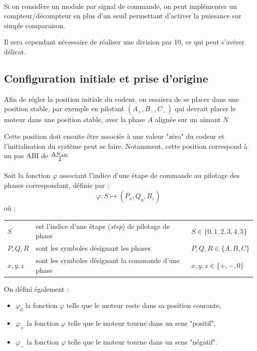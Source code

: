 \paragraph{}
Si on considère un module par signal de commande, on peut implémenter un compteur/décompteur en plus d'un seuil permettant d'activer la puissance sur simple comparaison.

Il sera cependant nécessaire de réaliser une division par 10, ce qui peut s'avérer délicat.

\subsection{Configuration initiale et prise d'origine}
Afin de régler la position initiale du codeur, on essaiera de se placer dans une position stable, par exemple en pilotant $(A_+, B_-, C_-)$ qui devrait placer le moteur dans une position stable, avec la phase $A$ alignée sur un aimant $N$

Cette position doit ensuite être associée à une valeur "zéro" du codeur et l'initialisation du système peut se faire.
Notamment, cette position correspond à un pas ABI de $\frac{\Delta N_\mathit{ABI}}{2}$


\paragraph{}
Soit la fonction $\varphi$ associant l'indice d'une étape de commande au pilotage des phases correspondant, définie par  :
$$\varphi : S \longmapsto (P_x,Q_y,R_z)$$
où :

\begin{tabular}{lll}
    $S$ & est l'indice d'une étape (\emph{step}) de pilotage de phase & $S \in \{0,1,2,3,4,5\}$ \\
    $P, Q, R$ & sont les symboles désignant les phases  & $P,Q,R \in \{A,B,C\}$ \\
    $x, y, z$ & sont les symboles désignant la commande d'une phase & $x, y, z \in \{+,-,0\}$
\end{tabular}
\newline
\newline
On défini également : 
\begin{itemize}
    \item $\varphi_0$ la fonction $\varphi$ telle que le moteur reste dans sa position courante,
    \item $\varphi_+$ la fonction $\varphi$ telle que le moteur tourne dans un sens "positif",
    \item $\varphi_-$ la fonction $\varphi$ telle que le moteur tourne dans un sens "négatif".
\end{itemize}

